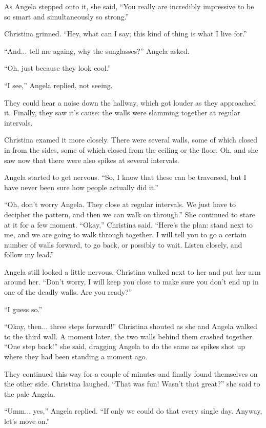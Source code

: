 \documentclass[showtrims,b6paper,draft,10pt]{memoir}
\begin{document}
As Angela stepped onto it, she said, ``You really are incredibly impressive to be so smart and simultaneously so strong.''

Christina grinned.  ``Hey, what can I say;  this kind of thing is what I live for.''

``And... tell me againg, why the sunglasses?'' Angela asked.

``Oh, just because they look cool.''

``I see,'' Angela replied, not seeing.

They could hear a noise down the hallway, which got louder as they approached it.  Finally, they saw it's cause:  the walls were slamming together at regular intervals.

Christina examed it more closely.  There were several walls, some of which closed in from the sides, some of which closed from the ceiling or the floor.  Oh, and she saw now that there were also spikes at several intervals.

Angela started to get nervous.  ``So, I know that these can be traversed, but I have never been sure how people actually did it.''

``Oh, don't worry Angela.  They close at regular intervals.  We just have to decipher the pattern, and then we can walk on through.''  She continued to stare at it for a few moment.  ``Okay,'' Christina said.  ``Here's the plan:  stand next to me, and we are going to walk through together.  I will tell you to go a certain number of walls forward, to go back, or possibly to wait.  Listen closely, and follow my lead.''

Angela still looked a little nervous, Christina walked next to her and put her arm around her.  ``Don't worry, I will keep you close to make sure you don't end up in one of the deadly walls.  Are you ready?''

``I guess so.''

``Okay, then... three steps forward!'' Christina shouted as she and Angela walked to the third wall.  A moment later, the two walls behind them crashed together.  ``One step back!''  she said, dragging Angela to do the same as spikes shot up where they had been standing a moment ago.

They continued this way for a couple of minutes and finally found themselves on the other side.  Christina laughed.  ``That was fun!  Wasn't that great?'' she said to the pale Angela.

``Umm... yes,'' Angela replied.  ``If only we could do that every single day.  Anyway, let's move on.''
\end{document}
